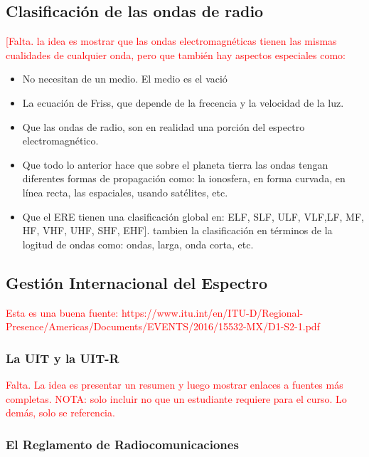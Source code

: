 \subsection{Clasificación de las ondas de radio}

\textcolor{red}{[Falta. la idea es mostrar que las ondas electromagnéticas tienen las mismas cualidades de cualquier onda, pero que también hay aspectos especiales como:}  \\
 
 \begin{itemize}
	
	\item  No necesitan de un medio. El medio es el vació\\
    \item  La ecuación de Friss, que depende de la frecencia y la velocidad de la luz.
    \item  Que las ondas de radio, son en realidad una porción del espectro electromagnético.\\
    \item  Que todo lo anterior hace que sobre el planeta tierra las ondas tengan diferentes formas de propagación como: la ionosfera, en forma curvada, en línea recta, las espaciales, usando satélites, etc.\\
    \item  Que el ERE tienen una clasificación global en: ELF, SLF, ULF, VLF,LF, MF, HF, VHF, UHF, SHF, EHF]. tambien la clasificación en términos de la logitud de ondas como: ondas, larga, onda corta, etc.\\
\end{itemize}

\subsection{Gestión Internacional del Espectro}
\textcolor{red}{Esta es una buena fuente: https://www.itu.int/en/ITU-D/Regional-Presence/Americas/Documents/EVENTS/2016/15532-MX/D1-S2-1.pdf}
\subsubsection{La UIT y la UIT-R}

\textcolor{red}{Falta. La idea es presentar un resumen y luego mostrar enlaces a fuentes más completas.
NOTA: solo incluir no que un estudiante requiere para el curso. Lo demás, solo se referencia.}

\subsubsection{El Reglamento de Radiocomunicaciones}

